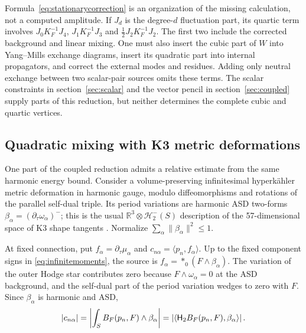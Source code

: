 Formula~\eqref{eq:stationarycorrection} is an organization of the
missing calculation, not a computed amplitude. If $J_d$ is the
degree-$d$ fluctuation part, its quartic term involves
$J_0K_F^{-1}J_4$, $J_1K_F^{-1}J_3$ and
$\tfrac12J_2K_F^{-1}J_2$. The first two include the corrected background
and linear mixing. One must also insert the cubic part of $W$ into
Yang--Mills exchange diagrams, insert its quadratic part into internal
propagators, and correct the external modes and residues. Adding only
neutral exchange between two scalar-pair sources omits these terms.
The scalar constraints in section~\ref{sec:scalar} and the vector pencil
in section~\ref{sec:coupled} supply parts of this reduction, but neither
determines the complete cubic and quartic vertices.

\subsection{Quadratic mixing with K3 metric deformations}
One part of the coupled reduction admits a relative estimate from the
same harmonic energy bound. Consider a volume-preserving infinitesimal
hyperk\"ahler metric deformation in harmonic gauge, modulo
diffeomorphisms and rotations of the parallel self-dual triple.
Its period variations are harmonic ASD two-forms
$\beta_\alpha=(\partial_\tau\omega_\alpha)^-$; this is the usual
$\mathbb R^3\otimes\mathcal H^-_2(S)$ description of the 57-dimensional
space of K3 shape tangents \cite{gik}. Normalize
$\sum_\alpha\|\beta_\alpha\|^2\le1$.

At fixed connection, put $f_\alpha=\partial_\tau\mu_\alpha$ and
$c_{n\alpha}=\langle p_n,f_\alpha\rangle$. Up to the fixed component
signs in \eqref{eq:infinitemoments}, the source is
$f_\alpha=*_0(F\wedge\beta_\alpha)$. The variation of the outer
Hodge star contributes zero because $F\wedge\omega_\alpha=0$ at the
ASD background, and the self-dual part of the period variation wedges
to zero with $F$. Since $\beta_\alpha$ is harmonic and ASD,
\begin{equation}\label{eq:shapesource}
 |c_{n\alpha}|
 =\left|\int_SB_F(p_n,F)\wedge\beta_\alpha\right|
 =\left|\langle\mathsf H_2B_F(p_n,F),\beta_\alpha\rangle\right|.
\end{equation}

